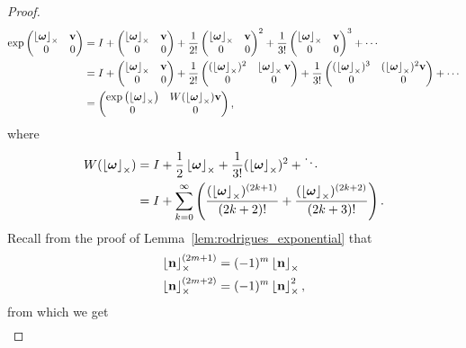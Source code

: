 \begin{proof}
\begin{align*}
\exp\begin{pmatrix}\ss{\omegabf} & \vbf\\
0 & 0
\end{pmatrix} & =I+\begin{pmatrix}\ss{\omegabf} & \vbf\\
0 & 0
\end{pmatrix}+\frac{1}{2!}\begin{pmatrix}\ss{\omegabf} & \vbf\\
0 & 0
\end{pmatrix}^{2}+\frac{1}{3!}\begin{pmatrix}\ss{\omegabf} & \vbf\\
0 & 0
\end{pmatrix}^{3}+\cdots\\
 & =I+\begin{pmatrix}\ss{\omegabf} & \vbf\\
0 & 0
\end{pmatrix}+\frac{1}{2!}\begin{pmatrix}(\ss{\omegabf})^{2} & \ss{\omegabf}\vbf\\
0 & 0
\end{pmatrix}+\frac{1}{3!}\begin{pmatrix}(\ss{\omegabf})^{3} & (\ss{\omegabf})^{2}\vbf\\
0 & 0
\end{pmatrix}+\cdots\\
 & =\begin{pmatrix}\exp\left(\ss{\omegabf}\right) & W(\ss{\omegabf}) \vbf\\
0 & 0
\end{pmatrix},
\end{align*}
where
\begin{align*}
W(\ss{\omegabf}) &= I+\frac{1}{2}\ss{\omegabf}+\frac{1}{3!}(\ss{\omegabf})^{2} + \ddots \\
	&= I + \sum_{k=0}^{\infty}\left(\frac{(\ss{\omegabf})^{\left(2k+1\right)}}{\left(2k+2\right)!}+\frac{(\ss{\omegabf})^{\left(2k+2\right)}}{\left(2k+3\right)!}\right).
\end{align*}
Recall from the proof of Lemma~\ref{lem:rodrigues_exponential} that 
\begin{align*}	
\ss{\nbf}^{(2m+1)} &= (-1)^m\ss{\nbf} \\
\ss{\nbf}^{(2m+2)} &= (-1)^m\ss{\nbf}^2,
\end{align*}
from which we get
\begin{align*}

\end{align*}
\end{proof}
